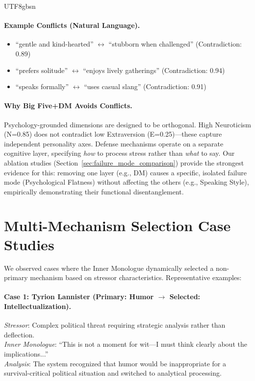 \documentclass[11pt]{article}
\begin{document}
\begin{CJK*}{UTF8}{gbsn}
\paragraph{Example Conflicts (Natural Language).}
\begin{itemize}
    \item ``gentle and kind-hearted'' $\leftrightarrow$ ``stubborn when challenged'' (Contradiction: 0.89)
    \item ``prefers solitude'' $\leftrightarrow$ ``enjoys lively gatherings'' (Contradiction: 0.94)
    \item ``speaks formally'' $\leftrightarrow$ ``uses casual slang'' (Contradiction: 0.91)
\end{itemize}

\paragraph{Why Big Five+DM Avoids Conflicts.} Psychology-grounded dimensions are designed to be orthogonal. High Neuroticism (N=0.85) does not contradict low Extraversion (E=0.25)---these capture independent personality axes. Defense mechanisms operate on a separate cognitive layer, specifying \textit{how} to process stress rather than \textit{what} to say. Our ablation studies (Section~\ref{sec:failure_mode_comparison}) provide the strongest evidence for this: removing one layer (e.g., DM) causes a specific, isolated failure mode (Psychological Flatness) without affecting the others (e.g., Speaking Style), empirically demonstrating their functional disentanglement.

\section{Multi-Mechanism Selection Case Studies}
\label{sec:multi_dm_cases}

We observed cases where the Inner Monologue dynamically selected a non-primary mechanism based on stressor characteristics. Representative examples:

\paragraph{Case 1: Tyrion Lannister (Primary: Humor $\rightarrow$ Selected: Intellectualization).}
\textit{Stressor}: Complex political threat requiring strategic analysis rather than deflection. \\
\textit{Inner Monologue}: ``This is not a moment for wit---I must think clearly about the implications...'' \\
\textit{Analysis}: The system recognized that humor would be inappropriate for a survival-critical political situation and switched to analytical processing.


\end{CJK*}
\end{document}
